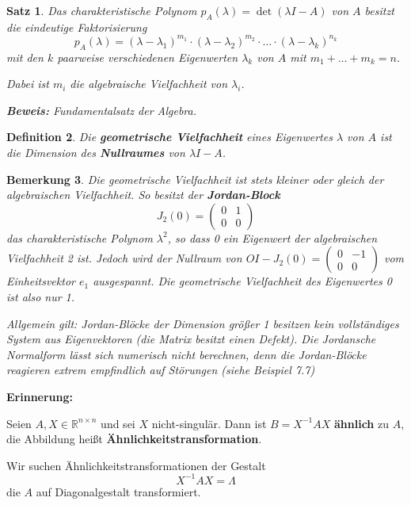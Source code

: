 \documentclass[%
a4paper,
11pt,		%
leqno,		%
]
{scrartcl}
\theoremstyle{plain}
\newtheorem{mydef}{Definition}[section]
\theoremstyle{plain}
\newtheorem{mysatz}[mydef]{Satz}
\theoremstyle{plain}
\newtheorem{mybem}[mydef]{Bemerkung}
\theoremstyle{plain}
\begin{document}
\begin{mysatz}
Das charakteristische Polynom $p_A(\lambda) = \det(\lambda I - A)$ von $A$ besitzt die eindeutige Faktorisierung
\[
p_A(\lambda) = (\lambda - \lambda_1)^{m_1} \cdot (\lambda - \lambda_2)^{m_2} \cdot \ldots \cdot (\lambda - \lambda_k)^{n_k}
\]
mit den $k$ paarweise verschiedenen Eigenwerten $\lambda_k$ von $A$ mit $m_1 + \ldots + m_k = n$.

Dabei ist $m_i$ die algebraische Vielfachheit von $\lambda_i$.\newline

\textbf{Beweis:} Fundamentalsatz der Algebra.
\end{mysatz}

\begin{mydef}
  Die \textbf{geometrische Vielfachheit} eines Eigenwertes $\lambda$ von $A$ ist die Dimension des \textbf{Nullraumes} von $\lambda I -A$.
\end{mydef}

\newpage

\begin{mybem}
Die geometrische Vielfachheit ist stets kleiner oder gleich der algebraischen Vielfachheit.
So besitzt der \textbf{Jordan-Block}
\[
J_2(0) = 
\begin{pmatrix}
0 & 1\\
0 & 0
\end{pmatrix}
\]
das charakteristische Polynom $\lambda^2$, so dass 0 ein Eigenwert der algebraischen Vielfachheit 2 ist. Jedoch wird der Nullraum von $OI - J_2(0) = \begin{pmatrix}
0 & -1\\
0 & 0
\end{pmatrix}$
vom Einheitsvektor $e_1$ ausgespannt.
Die geometrische Vielfachheit des Eigenwertes 0 ist also nur 1.

Allgemein gilt: Jordan-Blöcke der Dimension größer 1 besitzen kein vollständiges System aus Eigenvektoren (die Matrix besitzt einen \textit{Defekt}).
Die Jordansche Normalform lässt sich numerisch nicht berechnen, denn die Jordan-Blöcke reagieren extrem empfindlich auf Störungen (siehe Beispiel 7.7) %
\end{mybem}

\textbf{Erinnerung:}

Seien $A,X \in \mathbb{R}^{n \times n}$ und sei $X$ nicht-singulär. Dann ist $B=X^{-1}AX$ \textbf{ähnlich} zu $A$, die Abbildung heißt \textbf{Ähnlichkeitstransformation}.

Wir suchen Ähnlichkeitstransformationen der Gestalt
\[
X^{-1}AX = \Lambda
\]
die $A$ auf Diagonalgestalt transformiert.
\end{document}
